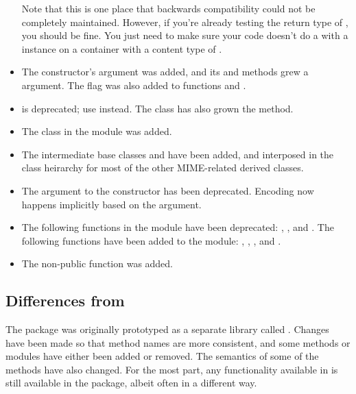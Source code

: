 \begin{itemize}
      Note that this is one place that backwards compatibility could
      not be completely maintained.  However, if you're already
      testing the return type of , you should be
      fine.  You just need to make sure your code doesn't do a
       with a  instance on a
      container with a content type of .
\item The  constructor's  argument was
      added, and its  and  methods
      grew a  argument.  The  flag was
      also added to functions 
      and .
\item {} is deprecated; use
       instead.  The 
      class has also grown the  method.
\item The  class in the
       module was added.
\item The intermediate base classes  and
       have been added, and interposed in the
      class heirarchy for most of the other MIME-related derived
      classes.
\item The  argument to the  constructor
      has been deprecated.  Encoding  now happens implicitly based
      on the  argument.
\item The following functions in the  module have
      been deprecated: ,
      , and .  The following
      functions have been added to the module:
      , ,
      , and .
\item The non-public function 
      was added.
\end{itemize}

\subsection{Differences from }

The  package was originally prototyped as a separate
library called
.
Changes have been made so that
method names are more consistent, and some methods or modules have
either been added or removed.  The semantics of some of the methods
have also changed.  For the most part, any functionality available in
 is still available in the  package,
albeit often in a different way.

